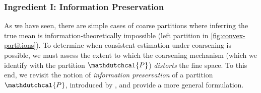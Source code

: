 \documentclass[11pt,letterpaper]{article}
\theoremstyle{plain}
\theoremstyle{definition}
\theoremstyle{remark}
\newcommand{\hypo}[1]{\mathdutchcal{#1}}
\newcommand{\hyP}{\hypo{P}}
\newcommand{\negsep}{\vspace{0mm}}
\begin{document}
\negsep{}

\subsubsection{Ingredient I: Information Preservation}
\label{sec:tool1}

As we have seen, there are simple cases of coarse partitions where inferring the true mean is information-theoretically impossible (left partition in \cref{fig:convex-partitions}). 
To determine when consistent estimation under coarsening is possible, we must assess the extent to which the coarsening mechanism (which we identify with the partition \(\hyP\)) \emph{distorts} the fine space.
To this end, we revisit the notion of \emph{information preservation} of a partition $\hyP$, 
introduced by \cite{fotakis2021coarse},
and provide a more general formulation.
\end{document}
